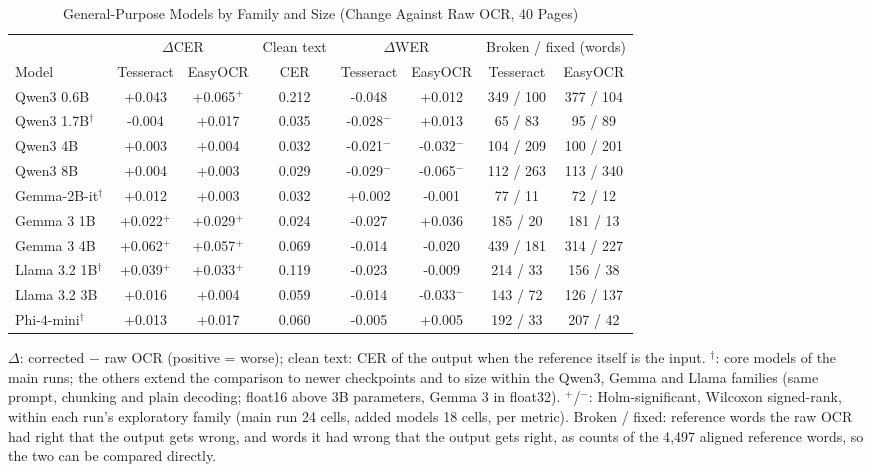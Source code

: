 \begin{table}[t]
\centering
\caption{General-Purpose Models by Family and Size (Change Against Raw OCR, 40 Pages)}
\label{tab:scale}
\setlength{\tabcolsep}{4pt}
\footnotesize
\begin{tabular}{lccccccc}
\toprule
 & \multicolumn{2}{c}{$\Delta$CER} & Clean text & \multicolumn{2}{c}{$\Delta$WER} & \multicolumn{2}{c}{Broken / fixed (words)} \\
\cmidrule(lr){2-3}\cmidrule(lr){4-4}\cmidrule(lr){5-6}\cmidrule(lr){7-8}
Model & Tesseract & EasyOCR & CER & Tesseract & EasyOCR & Tesseract & EasyOCR \\
\midrule
Qwen3 0.6B & +0.043 & +0.065$^{+}$ & 0.212 & -0.048 & +0.012 & 349 / 100 & 377 / 104 \\
Qwen3 1.7B$^{\dagger}$ & -0.004 & +0.017 & 0.035 & -0.028$^{-}$ & +0.013 & 65 / 83 & 95 / 89 \\
Qwen3 4B & +0.003 & +0.004 & 0.032 & -0.021$^{-}$ & -0.032$^{-}$ & 104 / 209 & 100 / 201 \\
Qwen3 8B & +0.004 & +0.003 & 0.029 & -0.029$^{-}$ & -0.065$^{-}$ & 112 / 263 & 113 / 340 \\
Gemma-2B-it$^{\dagger}$ & +0.012 & +0.003 & 0.032 & +0.002 & -0.001 & 77 / 11 & 72 / 12 \\
Gemma 3 1B & +0.022$^{+}$ & +0.029$^{+}$ & 0.024 & -0.027 & +0.036 & 185 / 20 & 181 / 13 \\
Gemma 3 4B & +0.062$^{+}$ & +0.057$^{+}$ & 0.069 & -0.014 & -0.020 & 439 / 181 & 314 / 227 \\
Llama 3.2 1B$^{\dagger}$ & +0.039$^{+}$ & +0.033$^{+}$ & 0.119 & -0.023 & -0.009 & 214 / 33 & 156 / 38 \\
Llama 3.2 3B & +0.016 & +0.004 & 0.059 & -0.014 & -0.033$^{-}$ & 143 / 72 & 126 / 137 \\
Phi-4-mini$^{\dagger}$ & +0.013 & +0.017 & 0.060 & -0.005 & +0.005 & 192 / 33 & 207 / 42 \\
\bottomrule
\end{tabular}
\par\smallskip
\begin{minipage}{\linewidth}\footnotesize $\Delta$: corrected $-$ raw OCR (positive = worse); clean text: CER of the output when the reference itself is the input. $^{\dagger}$: core models of the main runs; the others extend the comparison to newer checkpoints and to size within the Qwen3, Gemma and Llama families (same prompt, chunking and plain decoding; float16 above 3B parameters, Gemma 3 in float32). $^{+}$/$^{-}$: Holm-significant, Wilcoxon signed-rank, within each run's exploratory family (main run 24 cells, added models 18 cells, per metric). Broken / fixed: reference words the raw OCR had right that the output gets wrong, and words it had wrong that the output gets right, as counts of the 4{,}497 aligned reference words, so the two can be compared directly.\end{minipage}
\end{table}
